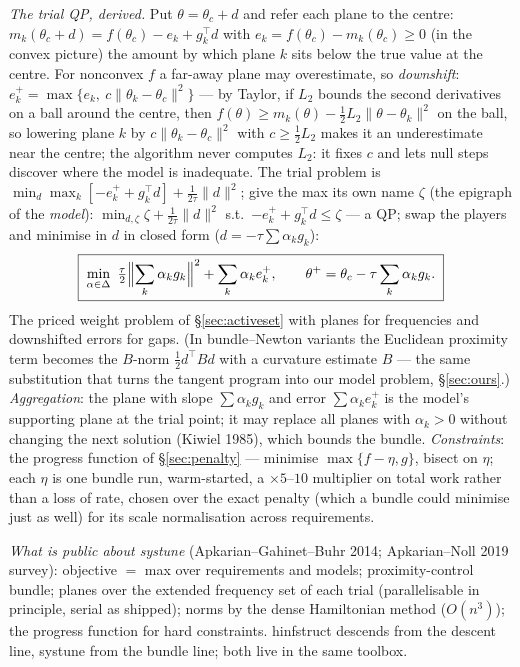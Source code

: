 \documentclass[11pt,a4paper]{article}
\newcommand{\T}{^{\!\top}}
\newcommand{\rev}[1]{#1}
\begin{document}
\emph{The trial QP, derived.}  Put $\theta=\theta_c+d$ and refer each plane to the
centre: $m_k(\theta_c+d)=f(\theta_c)-e_k+g_k\T d$ with
$e_k=f(\theta_c)-m_k(\theta_c)\ge0$ (in the convex picture) the amount by which plane $k$
sits below the true value at the centre.  For nonconvex $f$ a far-away plane may
overestimate, so \emph{downshift}: $e_k^+=\max\{e_k,\ c\|\theta_k-\theta_c\|^2\}$ ---
\rev{by Taylor, if $L_2$ bounds the second derivatives on a ball around the centre,
then $f(\theta)\ge m_k(\theta)-\tfrac12L_2\|\theta-\theta_k\|^2$ on the ball, so
lowering plane $k$ by $c\|\theta_k-\theta_c\|^2$ with $c\ge\tfrac12L_2$ makes it an
underestimate near the centre;} the algorithm
never computes $L_2$: it fixes $c$ and lets null steps discover where the model is
inadequate.  The trial problem is $\min_d\max_k[-e_k^++g_k\T d]+\tfrac1{2\tau}\|d\|^2$;
give the max its own name $\zeta$ (the epigraph of the \emph{model}):
$\min_{d,\zeta}\zeta+\tfrac1{2\tau}\|d\|^2$ s.t.\ $-e_k^++g_k\T d\le\zeta$ --- a QP; swap
the players and minimise in $d$ in closed form ($d=-\tau\sum\alpha_kg_k$):
\[
\boxed{\;\min_{\alpha\in\Delta}\ \tfrac\tau2\Bigl\|\sum_k\alpha_kg_k\Bigr\|^2+\sum_k\alpha_ke_k^+,
\qquad \theta^+=\theta_c-\tau\sum_k\alpha_kg_k .\;}
\]
The priced weight problem of \S\ref{sec:activeset} with planes for frequencies and
downshifted errors for gaps.  \rev{(In bundle--Newton variants the Euclidean proximity term becomes the $B$-norm
$\tfrac12d\T Bd$ with a curvature estimate $B$ --- the same substitution that turns
the tangent program into our model problem, \S\ref{sec:ours}.)}  \emph{Aggregation}: the plane with slope $\sum\alpha_kg_k$
and error $\sum\alpha_ke_k^+$ is the model's supporting plane at the trial point; it may
replace all planes with $\alpha_k>0$ without changing the next solution (Kiwiel 1985),
which bounds the bundle.  \emph{Constraints}: the \rev{progress function of \S\ref{sec:penalty} --- minimise
$\max\{f-\eta,g\}$, bisect on $\eta$; each $\eta$ is one bundle run, warm-started, a
$\times5$--$10$ multiplier on total work rather than a loss of rate, chosen over the
exact penalty (which a bundle could minimise just as well) for its scale normalisation
across requirements.}

\emph{What is public about \textsf{systune}} (Apkarian--Gahinet--Buhr 2014; Apkarian--Noll
2019 survey): objective $=$ max over requirements and models; proximity-control bundle;
planes over the extended frequency set of each trial (parallelisable in principle,
serial as shipped); norms by the dense Hamiltonian method ($O(n^3)$); the progress
function for hard constraints.  \textsf{hinfstruct} descends from the descent line,
\textsf{systune} from the bundle line; both live in the same toolbox.
\end{document}
